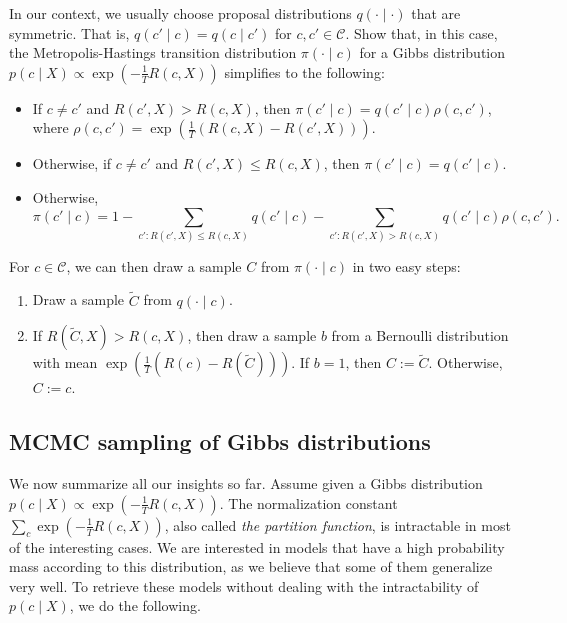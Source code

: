 \begin{exercise}
In our context, we usually choose proposal distributions $q(\cdot \mid \cdot)$
that are symmetric. That is, $q(c' \mid c) = q(c \mid c')$ for $c, c' \in \mathcal{C}$. Show that,
in this case, the Metropolis-Hastings transition distribution $\pi(\cdot \mid c)$ for a
Gibbs distribution $p(c \mid X) \propto \exp\left(-\frac{1}{T}R(c, X)\right)$ simplifies to the following:

\begin{itemize}
\item If $c \neq c'$ and $R(c', X) > R(c, X)$, then $\pi(c' \mid c) = q(c' \mid c)\rho(c, c')$, where $\rho(c, c') = \exp\left(\frac{1}{T}\left(R(c, X) - R(c', X)\right)\right)$.
\item Otherwise, if $c \neq c'$ and $R(c', X) \leq R(c, X)$, then $\pi(c' \mid c) = q(c' \mid c)$.
\item Otherwise,
%
\begin{equation}
\pi(c' \mid c) = 1 - \sum_{c' : R(c', X) \leq R(c, X)}q(c' \mid c) - \sum_{c': R(c', X) > R(c, X)}q(c' \mid c)\rho(c, c').
\end{equation}
%
\end{itemize}
\end{exercise}

For $c \in \mathcal{C}$, we can then draw a sample $C$ from $\pi(\cdot \mid c)$ in two easy steps:

\begin{enumerate}
\item Draw a sample $\tilde{C}$ from $q(\cdot \mid c)$.
\item If $R(\tilde{C}, X) > R(c, X)$, then draw a sample $b$ from a Bernoulli distribution with mean $\exp\left(\frac{1}{T}\left(R(c) - R(\tilde{C})\right)\right)$. If $b = 1$, then $C:= \tilde{C}$. Otherwise, $C := c$.
\end{enumerate}

\subsection{MCMC sampling of Gibbs distributions}

We now summarize all our insights so far. Assume given a Gibbs distribution $p(c \mid X) \propto \exp\left(-\frac{1}{T}R(c, X)\right)$. The normalization constant
$\sum_{c} \exp\left(-\frac{1}{T}R(c, X)\right)$,
also called \emph{the partition function}, is intractable in most of the interesting
cases. We are interested in models that have a high probability mass according
to this distribution, as we believe that some of them generalize
very well. To retrieve these models without dealing with the intractability
of $p(c \mid X)$, we do the following.


